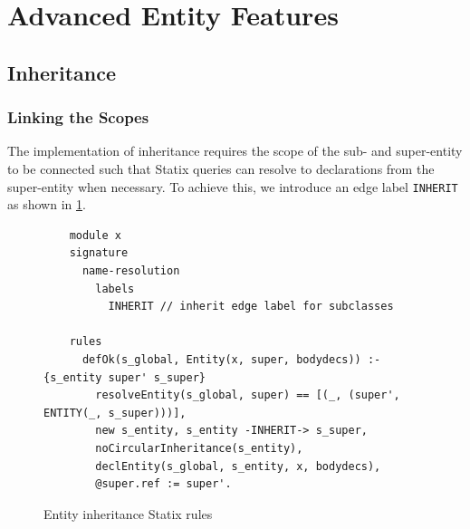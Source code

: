   \section{\label{sec:advanced-entity-features}Advanced Entity Features}
  
    \subsection{\label{subsec:inheritance}Inheritance}

      \subsubsection{Linking the Scopes}

      The implementation of inheritance requires the scope of the sub- and super-entity to be connected such that Statix queries can resolve to declarations from the super-entity when necessary. To achieve this, we introduce an edge label \texttt{INHERIT} as shown in \cref{fig:inheritance-statix-rules}.

      \begin{figure}
        \begin{verbatim}
    module x
    signature
      name-resolution
        labels
          INHERIT // inherit edge label for subclasses
  
    rules
      defOk(s_global, Entity(x, super, bodydecs)) :- {s_entity super' s_super}
        resolveEntity(s_global, super) == [(_, (super', ENTITY(_, s_super)))],
        new s_entity, s_entity -INHERIT-> s_super,
        noCircularInheritance(s_entity),
        declEntity(s_global, s_entity, x, bodydecs),
        @super.ref := super'.
        \end{verbatim}
        \caption{\label{fig:inheritance-statix-rules}Entity inheritance Statix rules}
      \end{figure}

